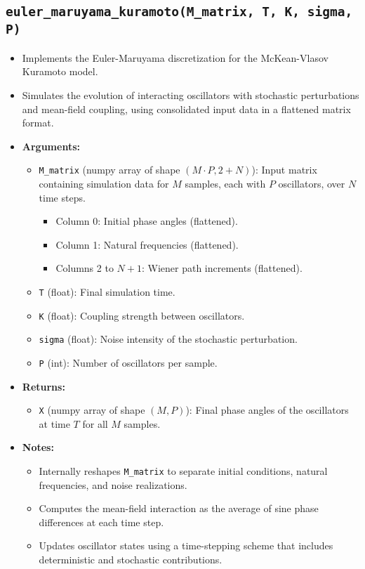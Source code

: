 \documentclass{article}
\begin{document}
\subsection{\texttt{euler\_maruyama\_kuramoto(M\_matrix, T, K, sigma, P)}}
\begin{itemize}
    \item Implements the Euler-Maruyama discretization for the McKean-Vlasov Kuramoto model.
    \item Simulates the evolution of interacting oscillators with stochastic perturbations and mean-field coupling, using consolidated input data in a flattened matrix format.
    
    \item \textbf{Arguments:}
    \begin{itemize}
        \item \texttt{M\_matrix} (numpy array of shape $(M \cdot P, 2 + N)$): Input matrix containing simulation data for $M$ samples, each with $P$ oscillators, over $N$ time steps.
        \begin{itemize}
            \item Column 0: Initial phase angles (flattened).
            \item Column 1: Natural frequencies (flattened).
            \item Columns 2 to $N+1$: Wiener path increments (flattened).
        \end{itemize}
        \item \texttt{T} (float): Final simulation time.
        \item \texttt{K} (float): Coupling strength between oscillators.
        \item \texttt{sigma} (float): Noise intensity of the stochastic perturbation.
        \item \texttt{P} (int): Number of oscillators per sample.
    \end{itemize}
    
    \item \textbf{Returns:}
    \begin{itemize}
        \item \texttt{X} (numpy array of shape $(M, P)$): Final phase angles of the oscillators at time $T$ for all $M$ samples.
    \end{itemize}
    
    \item \textbf{Notes:}
    \begin{itemize}
        \item Internally reshapes \texttt{M\_matrix} to separate initial conditions, natural frequencies, and noise realizations.
        \item Computes the mean-field interaction as the average of sine phase differences at each time step.
        \item Updates oscillator states using a time-stepping scheme that includes deterministic and stochastic contributions.
    \end{itemize}
\end{itemize}
\end{document}
